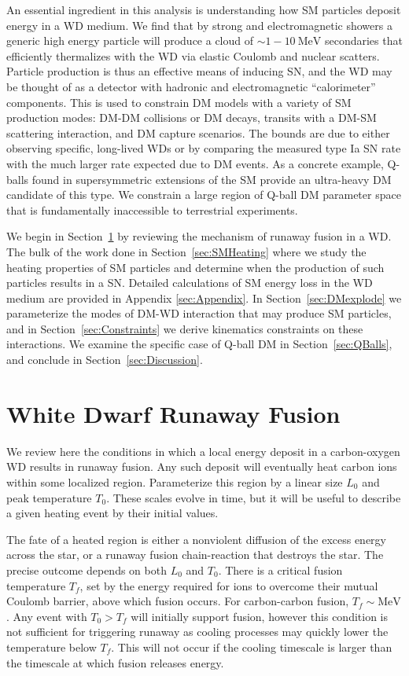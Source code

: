\documentclass[twocolumn,preprintnumbers,amsmath,amssymb,prl, superscriptaddress]{revtex4}
\newcommand{\MeV}{\text{MeV}}
\begin{document}
An essential ingredient in this analysis is understanding how SM particles deposit energy in a WD medium.
We find that by strong and electromagnetic showers a generic high energy particle will produce a cloud of $\sim 1-10~\MeV$ secondaries that efficiently thermalizes with the WD via elastic Coulomb and nuclear scatters.
Particle production is thus an effective means of inducing SN, and the WD may be thought of as a detector with hadronic and electromagnetic ``calorimeter'' components.
This is used to constrain DM models with a variety of SM production modes: DM-DM collisions or DM decays, transits with a DM-SM scattering interaction, and DM capture scenarios.
The bounds are due to either observing specific, long-lived WDs or by comparing the measured type Ia SN rate with the much larger rate expected due to DM events.
As a concrete example, Q-balls found in supersymmetric extensions of the SM provide an ultra-heavy DM candidate of this type.
We constrain a large region of Q-ball DM parameter space that is fundamentally inaccessible to terrestrial experiments.

We begin in Section~\ref{sec:Review} by reviewing the mechanism of runaway fusion in a WD.
The bulk of the work done in Section~\ref{sec:SMHeating} where we study the heating properties of SM particles and determine when the production of such particles results in a SN.
Detailed calculations of SM energy loss in the WD medium are provided in Appendix \ref{sec:Appendix}.
In Section~\ref{sec:DMexplode} we parameterize the modes of DM-WD interaction that may produce SM particles, and in Section~\ref{sec:Constraints} we derive kinematics constraints on these interactions.
We examine the specific case of Q-ball DM in Section~\ref{sec:QBalls}, and conclude in Section~\ref{sec:Discussion}.

\section{White Dwarf Runaway Fusion}
\label{sec:Review}

We review here the conditions in which a local energy deposit in a carbon-oxygen WD results in runaway fusion.
Any such deposit will eventually heat carbon ions within some localized region.
Parameterize this region by a linear size $L_0$ and peak temperature $T_0$.
These scales evolve in time, but it will be useful to describe a given heating event by their initial values.

The fate of a heated region is either a nonviolent diffusion of the excess energy across the star, or a runaway fusion chain-reaction that destroys the star.
The precise outcome depends on both $L_0$ and $T_0$.
There is a critical fusion temperature $T_f$, set by the energy required for ions to overcome their mutual Coulomb barrier, above which fusion occurs.
For carbon-carbon fusion, $T_f \sim \MeV$ \cite{Gasques:2005ar}.
Any event with $T_0 > T_f$ will initially support fusion, however this condition is not sufficient for triggering runaway as cooling processes may quickly lower the temperature below $T_f$.
This will not occur if the cooling timescale is larger than the timescale at which fusion releases energy.
\end{document}
